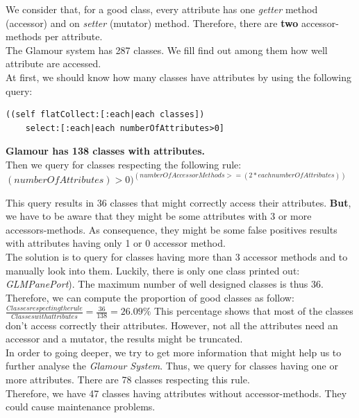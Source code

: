 \documentclass[11pt,a4paper]{article}
\begin{document}
We consider that, for a good class, every attribute has one \textit{getter} method (accessor) and on \textit{setter} (mutator) method. Therefore, there are \textbf{two} accessor-methods per attribute.\\

The Glamour system has 287 classes. We fill find out among them how well attribute are accessed.\\

At first, we should know how many classes have attributes by using the following query:\\
\begin{lstlisting}
((self flatCollect:[:each|each classes])
	select:[:each|each numberOfAttributes>0]
\end{lstlisting}
\textbf{Glamour has 138 classes with attributes.}\\
Then we query for classes respecting the following rule:\\
$(numberOfAttributes) > 0) ^ (numberOfAccessorMethods >= (2*each numberOfAttributes))$

This query results in 36 classes that might correctly access their attributes. \textbf{But}, we have to be aware that they might be some attributes with 3 or more accessors-methods. As consequence, they might be some false positives results with attributes having only 1 or 0 accessor method.\\ 

The solution is to query for classes having more than 3 accessor methods and to manually look into them. Luckily, there is only one class printed out:  \textit{GLMPanePort}). The maximum number of well designed classes is thus 36.\\

Therefore, we can compute the proportion of good classes as follow: $\frac{Classes respecting the rule}{Classes with attributes} = \frac{36}{138} = 26.09\%$
 This percentage shows that most of the classes don't access correctly their attributes. However, not all the attributes need an accessor and a mutator, the results might be truncated.\\ 

In order to going deeper, we try to get more information that might help us to further analyse the \textit{Glamour System}. Thus, we query for classes having one or more attributes. There are 78 classes respecting this rule.\\

Therefore, we have 47 classes having attributes without accessor-methods. They could cause maintenance problems.\\
\end{document}
